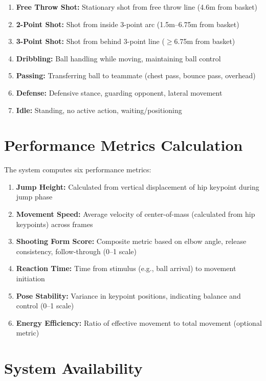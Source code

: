 \begin{enumerate}
    \item \textbf{Free Throw Shot:} Stationary shot from free throw line (4.6m from basket)
    \item \textbf{2-Point Shot:} Shot from inside 3-point arc (1.5m--6.75m from basket)
    \item \textbf{3-Point Shot:} Shot from behind 3-point line ($\geq$6.75m from basket)
    \item \textbf{Dribbling:} Ball handling while moving, maintaining ball control
    \item \textbf{Passing:} Transferring ball to teammate (chest pass, bounce pass, overhead)
    \item \textbf{Defense:} Defensive stance, guarding opponent, lateral movement
    \item \textbf{Idle:} Standing, no active action, waiting/positioning
\end{enumerate}

\section{Performance Metrics Calculation}
\label{app:metrics}

The system computes six performance metrics:

\begin{enumerate}
    \item \textbf{Jump Height:} Calculated from vertical displacement of hip keypoint during jump phase
    \item \textbf{Movement Speed:} Average velocity of center-of-mass (calculated from hip keypoints) across frames
    \item \textbf{Shooting Form Score:} Composite metric based on elbow angle, release consistency, follow-through (0--1 scale)
    \item \textbf{Reaction Time:} Time from stimulus (e.g., ball arrival) to movement initiation
    \item \textbf{Pose Stability:} Variance in keypoint positions, indicating balance and control (0--1 scale)
    \item \textbf{Energy Efficiency:} Ratio of effective movement to total movement (optional metric)
\end{enumerate}

\section{System Availability}
\label{app:availability}

